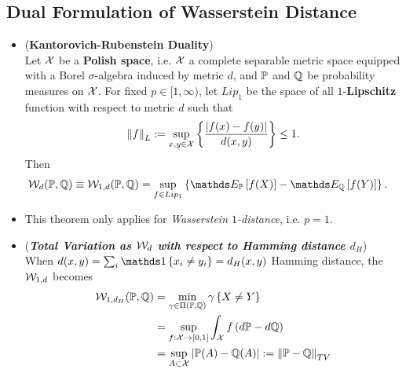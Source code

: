 \documentclass[11pt]{article}
\begin{document}
\subsection{Dual Formulation of Wasserstein Distance}
\begin{itemize}
\item \begin{theorem} (\textbf{Kantorovich-Rubenstein Duality}) \citep{villani2009optimal}\\
Let ${\mathcal X}$ be a \textbf{Polish space}, i.e. ${\mathcal X}$ a complete separable metric space equipped with a Borel $\sigma$-algebra induced by metric $d$, and ${\mathbb P}$ and ${\mathbb Q}$ be probability measures on ${\mathcal X}$. For fixed $p \in [1, \infty)$, let $Lip_1$ be the space of all 
$1$-\textbf{Lipschitz} function with respect to metric $d$  such that
\begin{align*}
\left\|f\right\|_{L}  := \sup_{x, y \in {\mathcal X}}\left\{\frac{\left\lvert f(x) - f(y) \right\rvert}{d(x, y)}\right\} \le 1.
\end{align*}
Then 
\begin{align}
\cW_{d}(\bP, \bQ) \equiv \cW_{1,d}(\bP, \bQ) &= \sup_{f \in Lip_1}\set{\E{\bP}{f(X)} - \E{\bQ}{f(Y)}}. \label{eqn: wass_dist_dual}
\end{align} 
\end{theorem}

\item \begin{remark}
This theorem only applies for \emph{Wasserstein $1$-distance}, i.e. $p = 1$.
\end{remark}

\item \begin{example} (\textbf{\emph{Total Variation as ${\mathcal W}_d$ with respect to Hamming distance $d_H$}})\\
When $d(x ,y) = \sum_i \ind{x_i \neq y_i} = d_H(x, y)$ Hamming distance, the ${\mathcal W}_{1, d}$ becomes
\begin{align*}
{\mathcal W}_{1, d_H}({\mathbb P}, {\mathbb Q}) &= \min_{\gamma \in \Pi({\mathbb P},{\mathbb Q})}\gamma\left\{X \neq Y \right\} \\
&= \sup_{f: {\mathcal X} \to [0, 1]}\int_{{\mathcal X}} f \left(d{\mathbb P} - d{\mathbb Q}\right)\\
& = \sup_{A \subset {\mathcal X}}\left\lvert {\mathbb P}(A) - {\mathbb Q}(A) \right\rvert := \left\|{\mathbb P} - {\mathbb Q}\right\|_{TV}
\end{align*}
\end{example}


\end{itemize}
\end{document}
